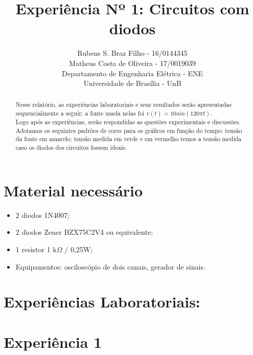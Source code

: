 \documentclass[10pt, final, a4paper]{IEEEtran} %
\begin{document}
	\title{Experiência Nº 1: Circuitos com diodos}
	\author{
		Rubens S. Braz Filho - 16/0144345\\
		Matheus Costa de Oliveira - 17/0019039\\
		Departamento de Engenharia Elétrica - ENE\\
		Universidade de Brasília - UnB
	}
\maketitle

\begin{abstract}
 Nesse relatório, as experiências laboratoriais e seus resultados serão apresentadas sequencialmente a seguir; a fonte usada nelas foi $v(t)=10sin(120 \pi t)$.\\
 Logo após as experiências, serão respondidas as questões experimentais e discussões.\\
 Adotamos os seguintes padrões de cores para os gráficos em função do tempo: tensão da fonte em amarelo; tensão medida em verde e em vermelho temos a tensão medida caso os diodos dos circuitos fossem ideais.
\end{abstract}

\section{Material necessário}
\vspace{0.2cm}

\begin{itemize}
	\item 2 diodos 1N4007;
	
	\item 2 diodos Zener BZX75C2V4 ou equivalente;
	
	\item 1 resistor 1 k$\Omega$ / 0,25W;
	
	\item Equipamentos: osciloscópio de dois canais, gerador de sinais.
\end{itemize}
\FloatBarrier

\section*{Experiências Laboratoriais:}
\vspace{0.5cm}

\section{Experiência 1}
\end{document}
